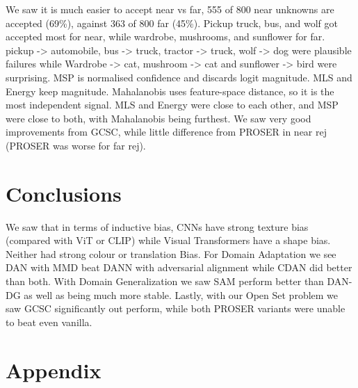 \documentclass{article}
\begin{document}
We saw it is much easier to accept near vs far, 555 of 800 near unknowns are accepted (69\%), against 363 of 800 far (45\%). Pickup truck, bus, and wolf got accepted most for near,
while wardrobe, mushrooms, and sunflower for far. pickup -> automobile, bus -> truck, tractor -> truck, wolf -> dog were plausible failures while Wardrobe -> cat, mushroom -> cat and sunflower -> bird were surprising.
MSP is normalised confidence and discards logit magnitude. MLS and Energy keep magnitude. Mahalanobis uses feature-space distance, so it is the most independent signal.
MLS and Energy were close to each other, and MSP were close to both, with Mahalanobis being furthest. We saw very good improvements from GCSC, while little difference from PROSER in near rej (PROSER was worse for far rej).
\section{Conclusions}
\label{sec:conclusion}

We saw that in terms of inductive bias, CNNs have strong texture bias (compared with ViT or CLIP) while Visual Transformers have a shape bias. Neither had strong colour or translation Bias.
For Domain Adaptation we see DAN with MMD beat DANN with adversarial alignment while CDAN did better than both. With Domain Generalization we saw SAM
perform better than DAN-DG as well as being much more stable. Lastly, with our Open Set problem we saw GCSC significantly out perform, while both PROSER variants
were unable to beat even vanilla.

\small


\normalsize

\clearpage
\appendix
\section*{Appendix}
\label{sec:appendix}
\end{document}
